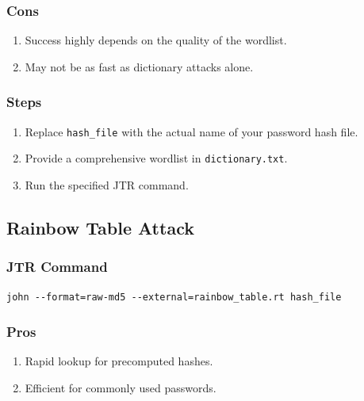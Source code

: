 \documentclass[11pt]{article}
\begin{document}
\subsubsection{Cons}

\begin{enumerate}
    \item Success highly depends on the quality of the wordlist.
    \item May not be as fast as dictionary attacks alone.
\end{enumerate}

\subsubsection{Steps}

\begin{enumerate}
    \item Replace \texttt{hash\_file} with the actual name of your password hash file.
    \item Provide a comprehensive wordlist in \texttt{dictionary.txt}.
    \item Run the specified JTR command.
\end{enumerate}




\subsection{Rainbow Table Attack}

\subsubsection{JTR Command}

\begin{verbatim}
john --format=raw-md5 --external=rainbow_table.rt hash_file
\end{verbatim}

\subsubsection{Pros}

\begin{enumerate}
    \item Rapid lookup for precomputed hashes.
    \item Efficient for commonly used passwords.
\end{enumerate}
\end{document}
